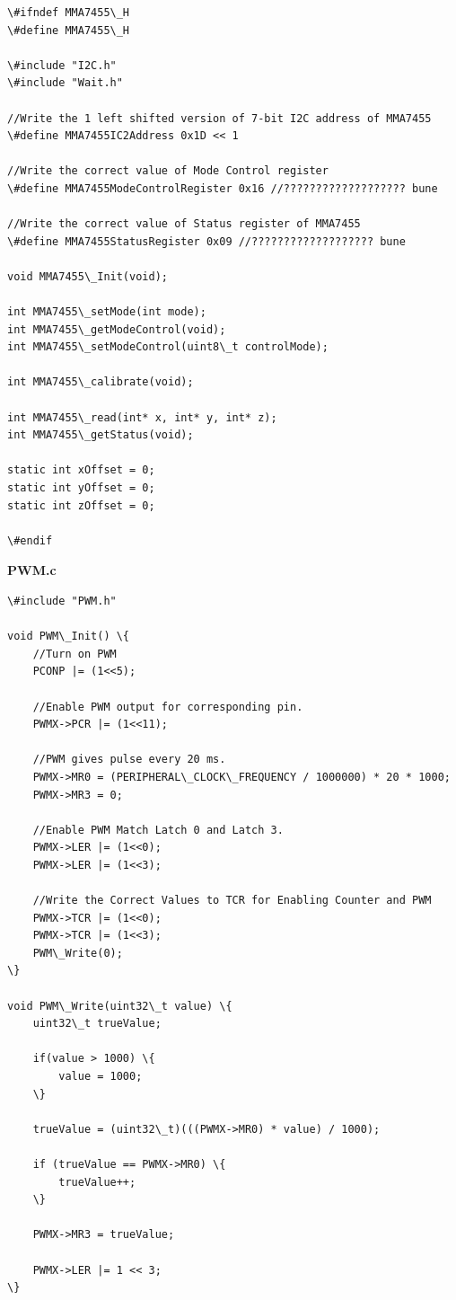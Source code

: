 \documentclass{article}
\begin{document}
\begin{lstlisting}
\#ifndef MMA7455\_H
\#define MMA7455\_H

\#include "I2C.h"
\#include "Wait.h"

//Write the 1 left shifted version of 7-bit I2C address of MMA7455
\#define MMA7455IC2Address 0x1D << 1

//Write the correct value of Mode Control register
\#define MMA7455ModeControlRegister 0x16 //??????????????????? bune

//Write the correct value of Status register of MMA7455
\#define MMA7455StatusRegister 0x09 //??????????????????? bune

void MMA7455\_Init(void);

int MMA7455\_setMode(int mode);
int MMA7455\_getModeControl(void);
int MMA7455\_setModeControl(uint8\_t controlMode);

int MMA7455\_calibrate(void);

int MMA7455\_read(int* x, int* y, int* z);
int MMA7455\_getStatus(void);

static int xOffset = 0;
static int yOffset = 0;
static int zOffset = 0;

\#endif
\end{lstlisting}
\linebreak
\textbf{PWM.c}
\begin{lstlisting}
\#include "PWM.h"

void PWM\_Init() \{
	//Turn on PWM
	PCONP |= (1<<5);

	//Enable PWM output for corresponding pin.
	PWMX->PCR |= (1<<11);

	//PWM gives pulse every 20 ms.
	PWMX->MR0 = (PERIPHERAL\_CLOCK\_FREQUENCY / 1000000) * 20 * 1000;
	PWMX->MR3 = 0;

	//Enable PWM Match Latch 0 and Latch 3.
	PWMX->LER |= (1<<0);
	PWMX->LER |= (1<<3);

	//Write the Correct Values to TCR for Enabling Counter and PWM
	PWMX->TCR |= (1<<0);
	PWMX->TCR |= (1<<3);
	PWM\_Write(0);
\}

void PWM\_Write(uint32\_t value) \{
	uint32\_t trueValue;

	if(value > 1000) \{
		value = 1000;
	\}

	trueValue = (uint32\_t)(((PWMX->MR0) * value) / 1000);

	if (trueValue == PWMX->MR0) \{
		trueValue++;
	\}

	PWMX->MR3 = trueValue;

	PWMX->LER |= 1 << 3;
\}
\end{lstlisting}
\end{document}
